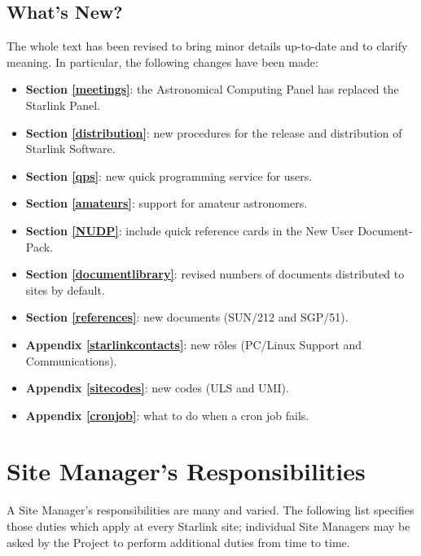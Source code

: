 \documentclass[twoside,11pt]{article}
\newcommand{\xref}[3]{#1}
\begin{document}
\subsection{What's New?}

The whole text has been revised to bring minor details up-to-date and
to clarify meaning.
In particular, the following changes have been made:

\begin{itemize}
\item {\bf Section \ref{meetings}}:
 the Astronomical Computing Panel has replaced the Starlink Panel.
\item {\bf Section \ref{distribution}}:
 new procedures for the release and distribution of Starlink Software.
\item {\bf Section \ref{qps}}:
 new quick programming service for users.
\item {\bf Section \ref{amateurs}}:
 support for amateur astronomers.
\item {\bf Section \ref{NUDP}}:
 include quick reference cards in the New User Document-Pack.
\item {\bf Section \ref{documentlibrary}}:
 revised numbers of documents distributed to sites by default.
\item {\bf Section \ref{references}}:
 new documents (\xref{SUN/212}{sun212}{} and \xref{SGP/51}{sgp51}{}).
\item {\bf Appendix \ref{starlinkcontacts}}:
 new r\^{o}les (PC/Linux Support and Communications).
\item {\bf Appendix \ref{sitecodes}}:
 new codes (ULS and UMI).
\item {\bf Appendix \ref{cronjob}}:
 what to do when a cron job fails.
\end{itemize}

\newpage

\section {\label{sitemanagersresponsibilities}Site Manager's Responsibilities}

A Site Manager's responsibilities are many and varied.
The following list specifies those duties which apply at every Starlink site;
individual Site Managers may be asked by the Project to perform additional
duties from time to time.
\end{document}
